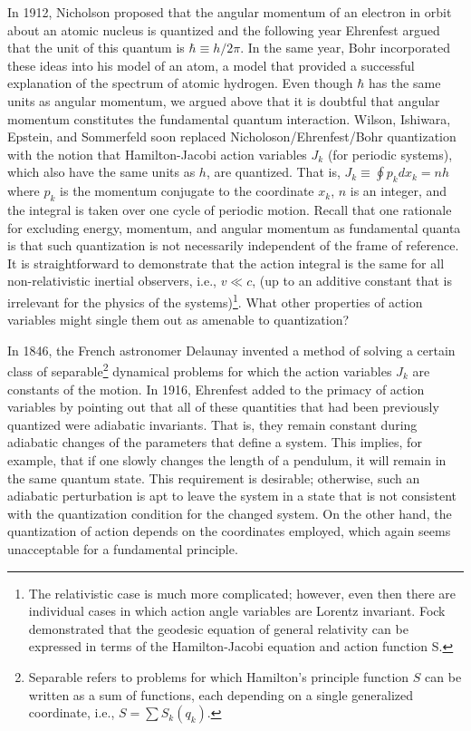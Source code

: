 \documentclass[12pt]{article}
\begin{document}
In 1912, Nicholson proposed that the angular momentum of an electron in orbit about an atomic nucleus is quantized and the following year Ehrenfest argued that the unit of this quantum is $\hbar \equiv h/2\pi$.  In the same year, Bohr incorporated these ideas into his model of an atom, a model that provided a successful explanation of the spectrum of atomic hydrogen.  Even though $\hbar$ has the same units as angular momentum, we argued above that it is doubtful that angular momentum constitutes the fundamental quantum interaction.  Wilson, Ishiwara, Epstein, and Sommerfeld soon replaced Nicholoson/Ehrenfest/Bohr quantization with the notion that Hamilton-Jacobi action variables $J_{k}$ (for periodic systems), which also have the same units as $h$, are quantized\cite{Wh1951}.  That is, $J_{k} \equiv \oint p_{k}dx_{k} = nh$ where $p_{k}$ is the momentum conjugate to the coordinate $x_{k}$, $n$ is an integer, and the integral is taken over one cycle of periodic motion.  Recall that one rationale for excluding energy, momentum, and angular momentum as fundamental quanta is that such quantization is not necessarily independent of the frame of reference.  It is straightforward to demonstrate that the action integral is the same for all non-relativistic inertial observers, i.e., $v \ll c$, (up to an additive constant that is irrelevant for the physics of the systems)\footnote{The relativistic case is much more complicated\cite{Ki1993}; however, even then there are individual cases in which action angle variables are Lorentz invariant\cite{Tr1999}.  Fock\cite{Fo1966} demonstrated that the geodesic equation of general relativity can be expressed in terms of the Hamilton-Jacobi equation and action function S.}.   What other properties of action variables might single them out as amenable to quantization?

In 1846, the French astronomer Delaunay invented a method of solving a certain class of separable\footnote{Separable refers to problems for which Hamilton's principle function $S$ can be written as a sum of functions, each depending on a single generalized coordinate, i.e., $S= \sum S_k(q_k)$.}
 dynamical problems for which the action variables $J_{k}$ are constants of the motion\cite{La1970}.  In 1916, Ehrenfest added to the primacy of action variables by pointing out that all of these quantities that had been previously quantized were adiabatic invariants\cite{Wh1951}.  That is, they remain constant during adiabatic changes of the parameters that define a system. This implies, for example, that if one slowly changes the length of a pendulum, it will remain in the same quantum state.  This requirement is desirable; otherwise, such an adiabatic perturbation is apt to leave the system in a state that is not consistent with the quantization condition for the changed system. On the other hand, the quantization of action depends on the coordinates employed, which again seems unacceptable for a fundamental principle.  
\end{document}
